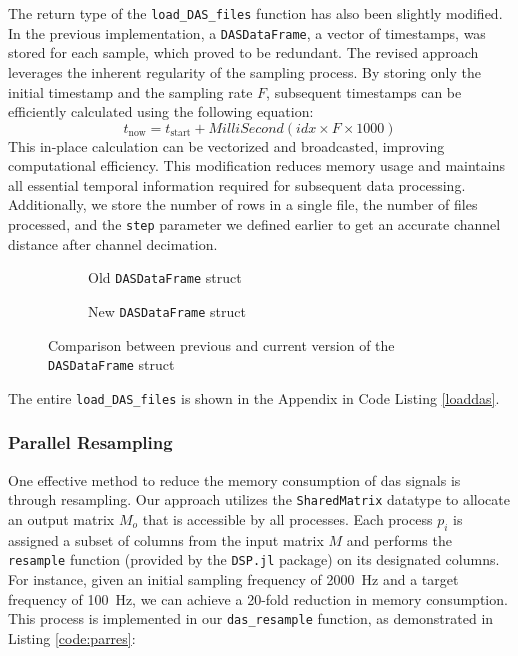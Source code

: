 The return type of the \texttt{load\_DAS\_files} function has also been slightly modified. In the previous implementation, a \texttt{DASDataFrame}, a vector of timestamps, was stored for each sample, which proved to be redundant. The revised approach leverages the inherent regularity of the sampling process. By storing only the initial timestamp and the sampling rate $F$, subsequent timestamps can be efficiently calculated using the following equation:
%
\begin{equation}
    t_{\text{now}} = t_{\text{start}} + MilliSecond(idx \times F \times 1000)
\end{equation}
%
This in-place calculation can be vectorized and broadcasted, improving computational efficiency. This modification reduces memory usage and maintains all essential temporal information required for subsequent data processing. Additionally, we store the number of rows in a single file, the number of files processed, and the \texttt{step} parameter we defined earlier to get an accurate channel distance after channel decimation.\\
\begin{figure}[!h]
\centering
\begin{subfigure}{.45\textwidth}
  \centering
  
  \caption{Old \texttt{DASDataFrame} struct}
  \label{fig:olddasstc}
\end{subfigure}%
\hfill
\begin{subfigure}{.45\textwidth}
  \centering
  
  \caption{New \texttt{DASDataFrame} struct}
  \label{fig:newdasstc}
\end{subfigure}
\caption{Comparison between previous and current version of the \texttt{DASDataFrame} struct}
\label{fig:dasstccmp}
\end{figure}
The entire \lstinline{load_DAS_files} is shown in the Appendix in Code Listing \ref{loaddas}.



\subsubsection{Parallel Resampling}


One effective method to reduce the memory consumption of \acrshort{das} signals is through resampling. Our approach utilizes the \texttt{SharedMatrix} datatype to allocate an output matrix $M_o$ that is accessible by all processes. Each process $p_i$ is assigned a subset of columns from the input matrix $M$ and performs the \texttt{resample} function (provided by the \texttt{DSP.jl} package) on its designated columns. For instance, given an initial sampling frequency of \qty{2000}{\hertz} and a target frequency of \qty{100}{\hertz}, we can achieve a 20-fold reduction in memory consumption. This process is implemented in our \texttt{das\_resample} function, as demonstrated in Listing \ref{code:parres}:


